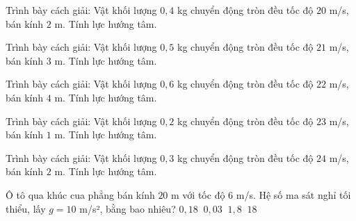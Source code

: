\begin{bt}
Trình bày cách giải: Vật khối lượng $0,4$ kg chuyển động tròn đều tốc độ $20$ m/s, bán kính $2$ m. Tính lực hướng tâm.
\end{bt}

\begin{bt}
Trình bày cách giải: Vật khối lượng $0,5$ kg chuyển động tròn đều tốc độ $21$ m/s, bán kính $3$ m. Tính lực hướng tâm.
\end{bt}

\begin{bt}
Trình bày cách giải: Vật khối lượng $0,6$ kg chuyển động tròn đều tốc độ $22$ m/s, bán kính $4$ m. Tính lực hướng tâm.
\end{bt}

\begin{bt}
Trình bày cách giải: Vật khối lượng $0,2$ kg chuyển động tròn đều tốc độ $23$ m/s, bán kính $1$ m. Tính lực hướng tâm.
\end{bt}

\begin{bt}
Trình bày cách giải: Vật khối lượng $0,3$ kg chuyển động tròn đều tốc độ $24$ m/s, bán kính $2$ m. Tính lực hướng tâm.
\end{bt}

\begin{ex}
Ô tô qua khúc cua phẳng bán kính $20$ m với tốc độ $6$ m/s. Hệ số ma sát nghỉ tối thiểu, lấy $g=10$ m/s², bằng bao nhiêu?
\choice
{\True $0,18\ \mathrm{}$}
{$0,03\ \mathrm{}$}
{$1,8\ \mathrm{}$}
{$18\ \mathrm{}$}
\end{ex}


